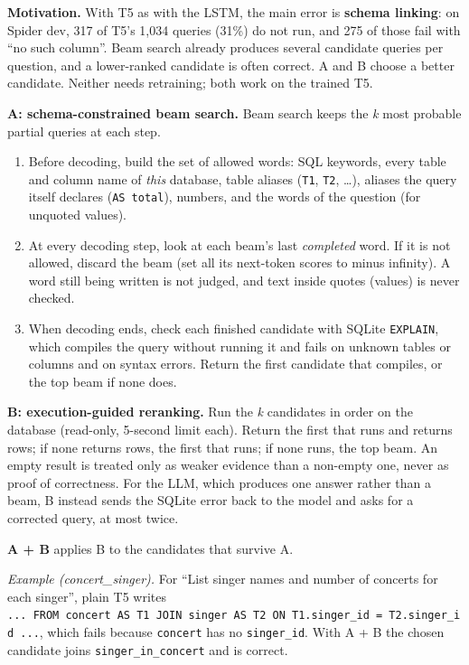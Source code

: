 \documentclass[
  10pt,
]{article}
\newcounter{none} %
\providecommand{\tightlist}{%
  \setlength{\itemsep}{0pt}\setlength{\parskip}{0pt}}
\begin{document}
\textbf{Motivation.} With T5 as with the LSTM, the main error is
\textbf{schema linking}: on Spider dev, 317 of T5's 1,034 queries (31\%)
do not run, and 275 of those fail with ``no such column''. Beam search
already produces several candidate queries per question, and a
lower-ranked candidate is often correct. A and B choose a better
candidate. Neither needs retraining; both work on the trained T5.

\textbf{A: schema-constrained beam search.} Beam search keeps the
\emph{k} most probable partial queries at each step.

\begin{enumerate}
\def\labelenumi{\arabic{enumi}.}
\tightlist
\item
  Before decoding, build the set of allowed words: SQL keywords, every
  table and column name of \emph{this} database, table aliases
  (\texttt{T1}, \texttt{T2}, \ldots), aliases the query itself declares
  (\texttt{AS\ total}), numbers, and the words of the question (for
  unquoted values).
\item
  At every decoding step, look at each beam's last \emph{completed}
  word. If it is not allowed, discard the beam (set all its next-token
  scores to minus infinity). A word still being written is not judged,
  and text inside quotes (values) is never checked.
\item
  When decoding ends, check each finished candidate with SQLite
  \texttt{EXPLAIN}, which compiles the query without running it and
  fails on unknown tables or columns and on syntax errors. Return the
  first candidate that compiles, or the top beam if none does.
\end{enumerate}

\textbf{B: execution-guided reranking.} Run the \emph{k} candidates in
order on the database (read-only, 5-second limit each). Return the first
that runs and returns rows; if none returns rows, the first that runs;
if none runs, the top beam. An empty result is treated only as weaker
evidence than a non-empty one, never as proof of correctness. For the
LLM, which produces one answer rather than a beam, B instead sends the
SQLite error back to the model and asks for a corrected query, at most
twice.

\textbf{A + B} applies B to the candidates that survive A.

\emph{Example (concert\_singer).} For ``List singer names and number of
concerts for each singer'', plain T5 writes
\texttt{...\ FROM\ concert\ AS\ T1\ JOIN\ singer\ AS\ T2\ ON\ T1.singer\_id\ =\ T2.singer\_id\ ...},
which fails because \texttt{concert} has no \texttt{singer\_id}. With A
+ B the chosen candidate joins \texttt{singer\_in\_concert} and is
correct.
\end{document}
